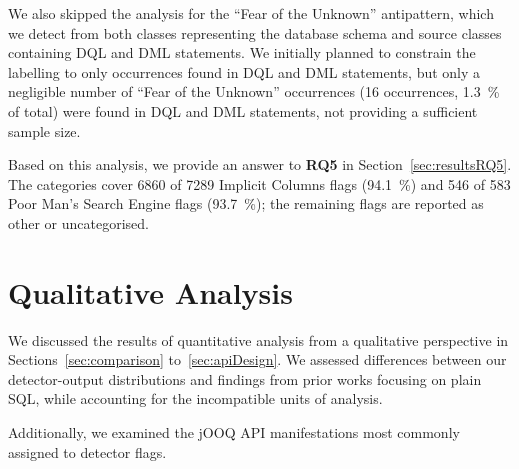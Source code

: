 We also skipped the analysis for the “Fear of the Unknown” antipattern, which we detect from both classes representing the database schema and source classes containing DQL and DML statements. We initially planned to constrain the labelling to only occurrences found in DQL and DML statements, but only a negligible number of “Fear of the Unknown” occurrences (\num{16} occurrences, \qty{1.3}{\percent} of total) were found in DQL and DML statements, not providing a sufficient sample size.

Based on this analysis, we provide an answer to \textbf{RQ5} in Section~\ref{sec:resultsRQ5}. The categories cover \num{6860} of \num{7289} Implicit Columns flags (\qty{94.1}{\percent}) and \num{546} of \num{583} Poor Man's Search Engine flags (\qty{93.7}{\percent}); the remaining flags are reported as other or uncategorised.

\section{Qualitative Analysis}

We discussed the results of quantitative analysis from a qualitative perspective in Sections~\ref{sec:comparison} to~\ref{sec:apiDesign}. We assessed differences between our detector-output distributions and findings from prior works focusing on plain SQL, while accounting for the incompatible units of analysis.

Additionally, we examined the jOOQ API manifestations most commonly assigned to detector flags.
